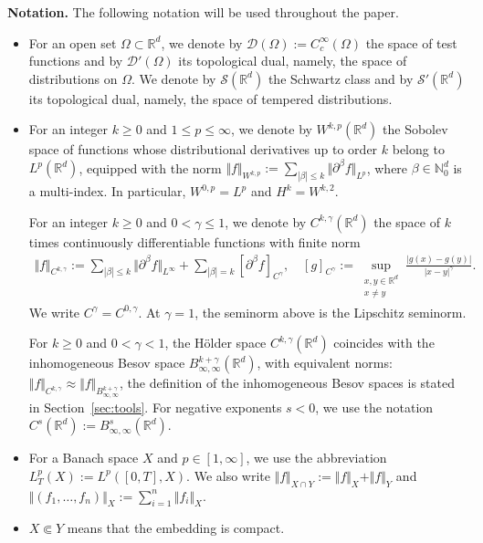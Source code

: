 \documentclass[reqno,11pt,a4paper]{amsart}
\begin{document}
\vskip1.5mm
\textbf{Notation.}
The following notation will be used throughout the paper.
\begin{itemize}

\item
For an open set $\Omega\subset\mathbb{R}^{d}$, we denote by
$\mathcal{D}(\Omega):=C_{c}^{\infty}(\Omega)$ the space of test
functions and by $\mathcal{D}'(\Omega)$ its topological dual, namely,
the space of distributions on $\Omega$. We denote by
$\mathcal{S}(\mathbb{R}^{d})$ the Schwartz class and by
$\mathcal{S}'(\mathbb{R}^{d})$ its topological dual, namely, the space
of tempered distributions.

\item For an integer $k\geq0$ and $1\leq p\leq\infty$, we denote by
$W^{k,p}(\mathbb{R}^d)$ the Sobolev space of functions whose
distributional derivatives up to order $k$ belong to
$L^p(\mathbb{R}^d)$, equipped with the norm $\Vert f\Vert _{W^{k,p}}
  :=\sum_{|\beta|\leq k}\Vert \partial^\beta f\Vert _{L^p}$, 
where $\beta\in\mathbb{N}_0^d$ is a multi-index.
In particular, $W^{0,p}=L^p$ and $H^k=W^{k,2}$.

For an integer $k\geq0$ and $0<\gamma\leq1$, we denote by
$C^{k,\gamma}(\mathbb{R}^d)$ the space of $k$ times continuously
differentiable functions with finite norm
\begin{align*}
  \Vert f\Vert _{C^{k,\gamma}}
  :=\sum_{|\beta|\leq k}\Vert \partial^\beta f\Vert _{L^\infty}
    +\sum_{|\beta|=k}[\partial^\beta f]_{C^\gamma},\quad
  [g]_{C^\gamma}
  :=\sup_{\substack{x,y\in\mathbb{R}^d\\x\neq y}}
    \frac{|g(x)-g(y)|}{|x-y|^\gamma}.
\end{align*}
We write $C^\gamma=C^{0,\gamma}$.
At $\gamma=1$, the seminorm above is the Lipschitz seminorm.

For $k\geq0$ and $0<\gamma<1$, the H\"older space
$C^{k,\gamma}(\mathbb{R}^d)$ coincides with the inhomogeneous
Besov space $B_{\infty,\infty}^{k+\gamma}(\mathbb{R}^d)$,
with equivalent norms: $\Vert f\Vert _{C^{k,\gamma}}
  \approx \Vert f\Vert _{B_{\infty,\infty}^{k+\gamma}}$, the definition of the inhomogeneous Besov spaces is stated in Section~\ref{sec:tools}. 
For negative exponents $s<0$, we use the notation
$C^s(\mathbb{R}^d):=B_{\infty,\infty}^s(\mathbb{R}^d)$.

    \item
    For a Banach
    space $X$ and $p\in[1,\infty]$, we use the abbreviation $L_ {T}^{p}(X):=L^{p}([0,T],X)$. 
    We also write
    $\Vert f\Vert _{X\cap Y}:=\Vert f\Vert _{X}+\Vert f\Vert _{Y}$ and
    $\Vert (f_{1},\ldots,f_{n})\Vert _{X}:=\sum_{i=1}^{n}\Vert f_{i}\Vert _{X}$.
\item $X \Subset Y$ means that the embedding is compact.


\end{itemize}
\end{document}
